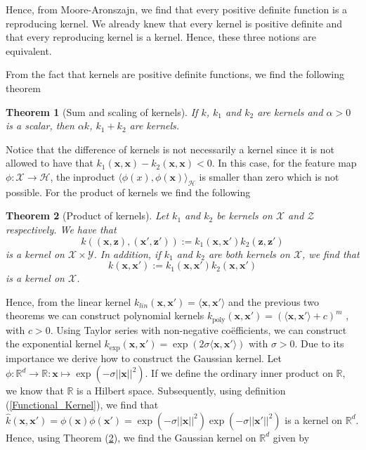 \documentclass[12pt,a4paper,oneside]{book}
\newtheorem{Theorem}{Theorem}
\begin{document}
Hence, from Moore-Aronszajn, we find that every positive definite function is a reproducing kernel. We already knew that every kernel is positive definite and that every reproducing kernel is a kernel. Hence, these three notions are equivalent. 

From the fact that kernels are positive definite functions, we find the following theorem 

\begin{Theorem}[Sum and scaling of kernels]
If $k$, $k_1$ and $k_2$ are kernels  and $\alpha >0$ is a scalar, then $\alpha k$, $k_1 + k_2$ are kernels.
\end{Theorem}

Notice that the difference of kernels is not necessarily a kernel since it is not allowed to have that $k_1(\bm{x},\bm{x}) - k_2(\bm{x},\bm{x}) <0$. In this case, for the feature map $ \phi : \mathcal{X} \rightarrow \mathcal{H}$, the inproduct $\langle \phi(x),\phi(\bm{x}) \rangle_{\mathcal{H}}$ is smaller than zero which is not possible. For the product of kernels we find the following

\begin{Theorem}[Product of kernels]\label{Functional_Product}
Let $k_1$ and $k_2$ be kernels on $\mathcal{X}$ and $\mathcal{Z}$ respectively. We have that 
\begin{equation}\label{Functional_Product_first_eq}
k((\bm{x},\bm{z}),(\bm{x}',\bm{z}')) := k_1(\bm{x},\bm{x}')k_2(\bm{z},\bm{z}')
\end{equation}
is a kernel on $\mathcal{X} \times \mathcal{Y}$. In addition, if $k_1$ and $k_2$ are both kernels on $\mathcal{X}$, we find that 
\begin{equation}
k(\bm{x},\bm{x}') := k_1(\bm{x},\bm{x}')k_2(\bm{x},\bm{x}')
\end{equation}
is a kernel on $\mathcal{X}$.
\end{Theorem}

Hence, from the linear kernel $k_{lin} (\bm{x},\bm{x}') = \langle \bm{x},\bm{x}' \rangle$ and the previous two theorems we can construct polynomial kernels $ k_{\text{poly}}(\bm{x},\bm{x}') = (\langle \bm{x},\bm{x}' \rangle + c)^{m}$ , with $c>0$. Using Taylor series with non-negative co\"{e}fficients, we can construct the exponential kernel $ k_{\exp}(\bm{x},\bm{x}') = \exp(2\sigma \langle \bm{x},\bm{x}' \rangle)$ with $\sigma >0$. Due to its importance we derive how to construct the Gaussian kernel. Let $\phi : \mathbb{R}^d \rightarrow \mathbb{R} : \bm{x} \mapsto \exp(-\sigma ||\bm{x}||^2)$. If we define the ordinary inner product on $\mathbb{R}$, we know that $\mathbb{R}$ is a Hilbert space. Subsequently, using definition (\ref{Functional_Kernel}), we find that $\hat{k}(\bm{x},\bm{x}') = \phi(\bm{x}) \phi(\bm{x}') = \exp(-\sigma ||\bm{x}||^2) \exp(-\sigma ||\bm{x}'||^2)$ is a kernel on $\mathbb{R}^d$. Hence, using Theorem (\ref{Functional_Product}), we find the Gaussian kernel on $\mathbb{R}^d$ given by 
\end{document}
